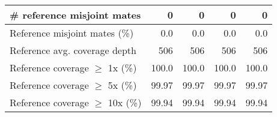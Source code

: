 \documentclass[12pt,a4paper]{article}
\begin{document}
\begin{table}[ht]
\begin{center}
\begin{tabular}{|l*{4}{|r}|}
\# reference misjoint mates & 0 & 0 & 0 & 0 \\ \hline
Reference misjoint mates (\%) & 0.0 & 0.0 & 0.0 & 0.0 \\ \hline
Reference avg. coverage depth & 506 & 506 & 506 & 506 \\ \hline
Reference coverage $\geq$ 1x (\%) & 100.0 & 100.0 & 100.0 & 100.0 \\ \hline
Reference coverage $\geq$ 5x (\%) & 99.97 & 99.97 & 99.97 & 99.97 \\ \hline
Reference coverage $\geq$ 10x (\%) & 99.94 & 99.94 & 99.94 & 99.94 \\ \hline
\end{tabular}
\end{center}
\end{table}
\end{document}
